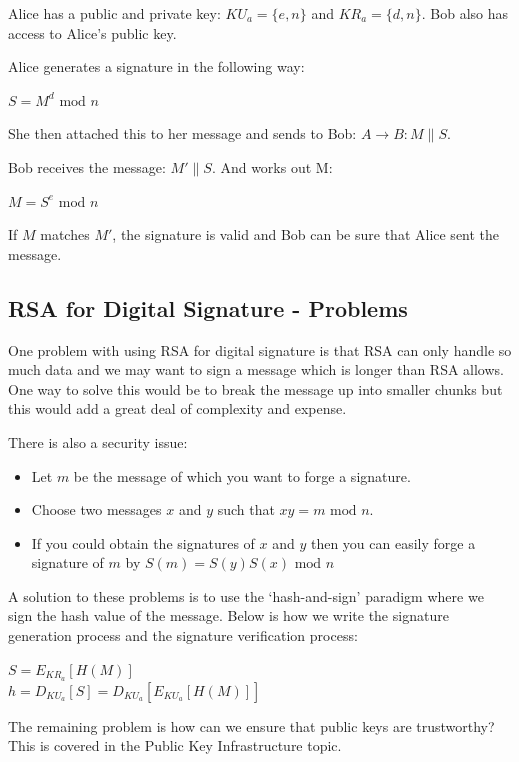 \documentclass{article}
\newcommand{\Mod}[1]{\text{ mod }#1}
\begin{document}
Alice has a public and private key: $KU_{a} = \{e, n\}$ and $KR_{a} = \{d, n\}$. Bob also has access to Alice's public key.

Alice generates a signature in the following way:
\begin{center}
  $S = M^{d} \Mod n$
\end{center}
She then attached this to her message and sends to Bob: $A \rightarrow B: M\|S$.

Bob receives the message: $M'\|S$. And works out M:
\begin{center}
  $M = S^{e} \Mod n$
\end{center}
If $M$ matches $M'$, the signature is valid and Bob can be sure that Alice sent the message.

\subsection{RSA for Digital Signature - Problems}
One problem with using RSA for digital signature is that RSA can only handle so much data and we may want to sign a message which is longer than RSA allows. One way to solve this would be to break the message up into smaller chunks but this would add a great deal of complexity and expense.

There is also a security issue:
\begin{itemize}
  \item Let $m$ be the message of which you want to forge a signature.
  \item Choose two messages $x$ and $y$ such that $xy = m \Mod n$.
  \item If you could obtain the signatures of $x$ and $y$ then you can easily forge a signature of $m$ by $S(m) = S(y)S(x) \Mod n$
\end{itemize}
A solution to these problems is to use the `hash-and-sign' paradigm where we sign the hash value of the message. Below is how we write the signature generation process and the signature verification process:
\begin{center}
  $S=E_{KR_{a}}[H(M)]$ \\
  $h=D_{KU_{a}}[S] = D_{KU_{a}}[E_{KU_{a}}[H(M)]]$
\end{center}
The remaining problem is how can we ensure that public keys are trustworthy? This is covered in the Public Key Infrastructure topic.
\end{document}

